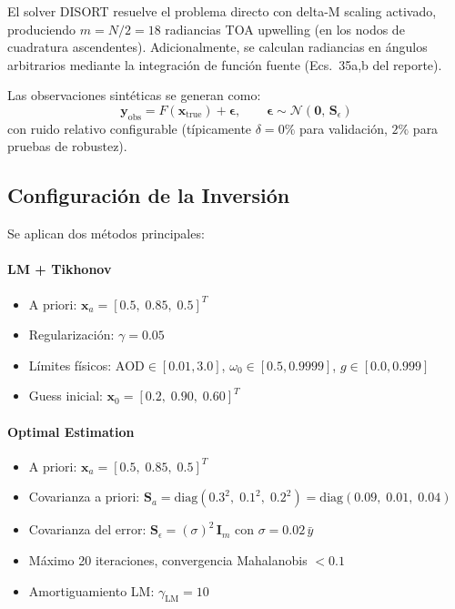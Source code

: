 \documentclass[a4paper,11pt]{article}
\begin{document}
El solver DISORT resuelve el problema directo con delta-M scaling activado,
produciendo $m = N/2 = 18$ radiancias TOA upwelling (en los nodos de
cuadratura ascendentes). Adicionalmente, se calculan radiancias en \'angulos
arbitrarios mediante la integraci\'on de funci\'on fuente
(Ecs.~35a,b del reporte).

Las observaciones sint\'eticas se generan como:
\begin{equation}
    \mathbf{y}_{\text{obs}} = F(\mathbf{x}_{\text{true}}) + \bm{\epsilon},
    \qquad \bm{\epsilon} \sim \mathcal{N}(\mathbf{0},\,\mathbf{S}_\epsilon)
\end{equation}
con ruido relativo configurable (t\'ipicamente $\delta = 0\%$ para
validaci\'on, $2\%$ para pruebas de robustez).

\subsection{Configuraci\'on de la Inversi\'on}

Se aplican dos m\'etodos principales:

\paragraph{LM + Tikhonov}
\begin{itemize}
    \item A priori: $\mathbf{x}_a = [0.5,\; 0.85,\; 0.5]^T$
    \item Regularizaci\'on: $\gamma = 0.05$
    \item L\'imites f\'isicos: $\text{AOD}\in[0.01, 3.0]$,
          $\omega_0\in[0.5, 0.9999]$, $g\in[0.0, 0.999]$
    \item Guess inicial: $\mathbf{x}_0 = [0.2,\; 0.90,\; 0.60]^T$
\end{itemize}

\paragraph{Optimal Estimation}
\begin{itemize}
    \item A priori: $\mathbf{x}_a = [0.5,\; 0.85,\; 0.5]^T$
    \item Covarianza a priori: $\mathbf{S}_a = \text{diag}(0.3^2,\; 0.1^2,\; 0.2^2)
          = \text{diag}(0.09,\; 0.01,\; 0.04)$
    \item Covarianza del error: $\mathbf{S}_\epsilon = (\sigma)^2\,\mathbf{I}_m$
          con $\sigma = 0.02\,\bar{y}$
    \item M\'aximo 20 iteraciones, convergencia Mahalanobis $< 0.1$
    \item Amortiguamiento LM: $\gamma_{\text{LM}} = 10$
\end{itemize}
\end{document}
